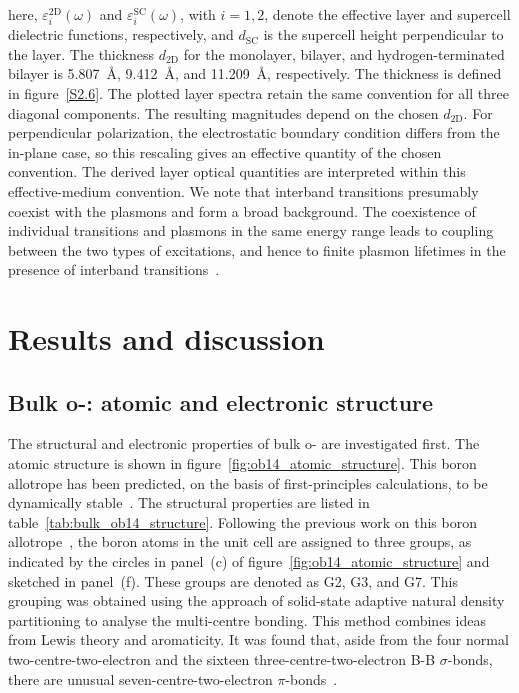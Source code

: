 here, $\varepsilon_{i}^{\mathrm{2D}}(\omega)$ and $\varepsilon_{i}^{\mathrm{SC}}(\omega)$,
with $i=1,2$, denote the effective layer and supercell dielectric functions,
respectively, and $d_{\mathrm{SC}}$ is the supercell height perpendicular to the layer.
The thickness $d_{\mathrm{2D}}$ for the monolayer, bilayer,
and hydrogen-terminated bilayer is \qty{5.807}{\angstrom},
\qty{9.412}{\angstrom}, and \qty{11.209}{\angstrom}, respectively.
The thickness is defined in figure~\ref{S2.6}.
The plotted layer spectra retain the same convention for all three diagonal components.
The resulting magnitudes depend on the chosen $d_{\mathrm{2D}}$.
For perpendicular polarization, the electrostatic boundary condition differs from the in-plane case,
so this rescaling gives an effective quantity of the chosen convention.
The derived layer optical quantities are interpreted within this effective-medium convention.
We note that interband transitions presumably coexist with the plasmons and form a broad background.
The coexistence of individual transitions and plasmons in the same energy range leads to coupling between the two types of excitations,
and hence to finite plasmon lifetimes in the presence of interband transitions~\cite{li2017first}.

\section{Results and discussion}
\label{2_results}


\subsection{\texorpdfstring{Bulk o-: atomic and electronic structure}{Bulk o-B14: atomic and electronic structure}}
\label{2_bulk_atomic_electronic_structure}

The structural and electronic properties of bulk o- are investigated first.
The atomic structure is shown in figure~\ref{fig:ob14_atomic_structure}.
This boron allotrope has been predicted, on the basis of first-principles calculations,
to be dynamically stable~\cite{han2023superconducting}.
The structural properties are listed in table~\ref{tab:bulk_ob14_structure}.
Following the previous work on this boron allotrope~\cite{han2023superconducting},
the boron atoms in the unit cell are assigned to three groups,
as indicated by the circles in panel~(c) of figure~\ref{fig:ob14_atomic_structure} and sketched in panel~(f).
These groups are denoted as G2, G3, and G7.
This grouping was obtained using the approach of solid-state adaptive natural density partitioning to analyse the multi-centre bonding.
This method combines ideas from Lewis theory and aromaticity.
It was found that, aside from the four normal two-centre-two-electron and the sixteen three-centre-two-electron B-B $\sigma$-bonds,
there are unusual seven-centre-two-electron $\pi$-bonds~\cite{han2023superconducting}.

